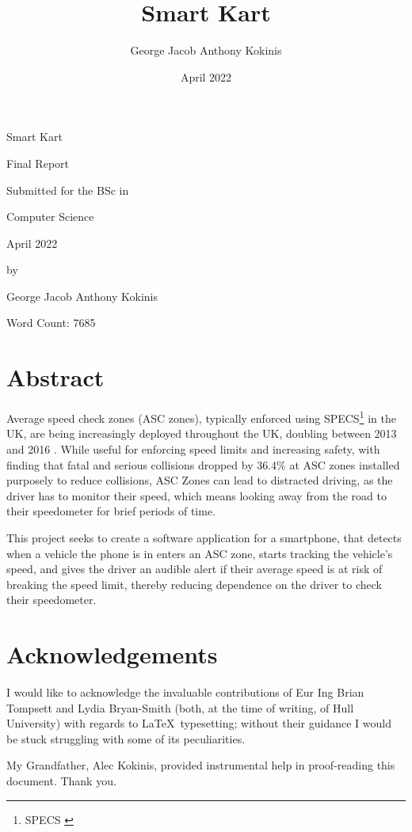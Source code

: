 \documentclass[11pt, a4paper, notitlepage]{report}
\title{Smart Kart}
\date{April 2022}
\author{George Jacob Anthony Kokinis}
\begin{document}
\begin{center}
	{\Huge Smart Kart}
	
	\bigskip
	{\Large Final Report}
	
	\bigskip
	Submitted for the BSc in
	
	\bigskip
	{\LARGE Computer Science}
	
	\bigskip
	April 2022
	
	\bigskip
	by 
	
	\bigskip
	{\LARGE George Jacob Anthony Kokinis}
    
    \bigskip
    Word Count: 7685 %
\end{center}
\newpage
\section{Abstract}
Average speed check zones (ASC zones), typically enforced using SPECS\footnote{SPECS \citep{specsjenop}} in the UK, are being increasingly deployed throughout the UK, doubling between 2013 and 2016 \citep{BBCSpeedCameraDoubled}. While useful for enforcing speed limits and increasing safety, with \citet{owenAllsop} finding that fatal and serious collisions dropped by 36.4\% at ASC zones installed purposely to reduce collisions, ASC Zones can lead to distracted driving, as the driver has to monitor their speed, which means looking away from the road to their speedometer for brief periods of time.

This project seeks to create a software application for a smartphone, that detects when a vehicle the phone is in enters an ASC zone, starts tracking the vehicle's speed, and gives the driver an audible alert if their average speed is at risk of breaking the speed limit, thereby reducing dependence on the driver to check their speedometer.

\section{Acknowledgements}
I would like to acknowledge the invaluable contributions of Eur Ing Brian Tompsett and Lydia Bryan-Smith (both, at the time of writing, of Hull University) with regards to \LaTeX\ typesetting; without their guidance I would be stuck struggling with some of its peculiarities.

My Grandfather, Alec Kokinis, provided instrumental help in proof-reading this document. Thank you.
\end{document}
